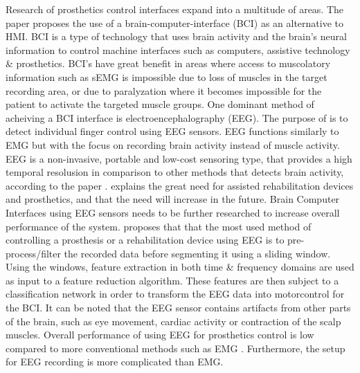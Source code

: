 \documentclass[../main.tex]{subfiles}
\begin{document}
Research of prosthetics control interfaces expand into a multitude of areas.
The paper \cite{fnins2016} proposes the use of a brain-computer-interface (BCI) as an alternative to HMI.
BCI is a type of technology that uses brain activity and the brain's neural information to control machine interfaces such as computers, assistive technology \& prosthetics.
BCI's have great benefit in areas where access to muscolatory information such as sEMG is impossible due to loss of muscles in the target recording area, or due to paralyzation where it becomes impossible for the patient to activate the targeted muscle groups.
One dominant method of acheiving a BCI interface is electroencephalography (EEG).
The purpose of \cite{fnins2016} is to detect individual finger control using EEG sensors. 
EEG functions similarly to EMG but with the focus on recording brain activity instead of muscle activity.
EEG is a non-invasive, portable and low-cost sensoring type, that provides a high temporal resolusion in comparison to other methods that detects brain activity, according to the paper \cite{quraishi2018}.
\cite{quraishi2018} explains the great need for assisted rehabilitation devices and prosthetics, and that the need will increase in the future.
Brain Computer Interfaces using EEG sensors needs to be further researched to increase overall performance of the system.
\cite{quraishi2018} proposes that that the most used method of controlling a prosthesis or a rehabilitation device using EEG is to pre-process/filter the recorded data before segmenting it using a sliding window.
Using the windows, feature extraction in both time \& frequency domains are used as input to a feature reduction algorithm.
These features are then subject to a classification network in order to transform the EEG data into motorcontrol for the BCI.
It can be noted that the EEG sensor contains artifacts from other parts of the brain, such as eye movement, cardiac activity or contraction of the scalp muscles. 
Overall performance of using EEG for prosthetics control is low compared to more conventional methods such as EMG \cite{quraishi2018} .
Furthermore, the setup for EEG recording is more complicated than EMG.
\end{document}
